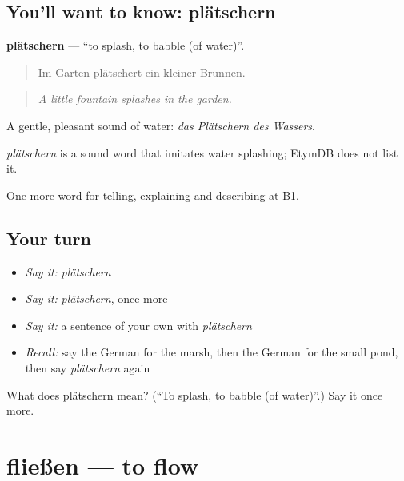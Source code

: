\subsection*{You'll want to know: plätschern}
\textbf{plätschern} — \textquotedblleft{}to splash, to babble (of water)\textquotedblright{}.

\begin{quote}
Im Garten plätschert ein kleiner Brunnen.
\end{quote}

\begin{quote}
\emph{A little fountain splashes in the garden.}
\end{quote}

A gentle, pleasant sound of water: \emph{das Plätschern des Wassers}.

\begin{cousinweb}
\emph{plätschern} is a sound word that imitates water splashing; EtymDB does not list it.
\end{cousinweb}

\begin{grammarlens}[title={What you've built}]
One more word for telling, explaining and describing at B1.
\end{grammarlens}

\subsection*{Your turn}
\begin{itemize}
\raggedright
  \item \emph{Say it:} \emph{plätschern}
  \item \emph{Say it:} \emph{plätschern}, once more
  \item \emph{Say it:} a sentence of your own with \emph{plätschern}
  \item \emph{Recall:} say the German for the marsh, then the German for the small pond, then say \emph{plätschern} again
\end{itemize}

\begin{tcolorbox}[breakable,colback=teal!4,colframe=teal!35!black,title={Before you move on}]
What does plätschern mean? (\textquotedblleft{}To splash, to babble (of water)\textquotedblright{}.) Say it once more.
\end{tcolorbox}
\section[fließen]{fließen — to flow}

